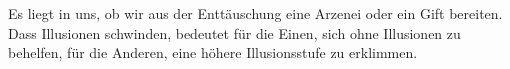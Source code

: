 Es liegt in uns, ob wir aus der Enttäuschung eine Arzenei oder ein Gift bereiten. Dass Illusionen schwinden, bedeutet für die Einen, sich ohne Illusionen zu behelfen, für die Anderen, eine höhere Illusionsstufe zu erklimmen.
\par

